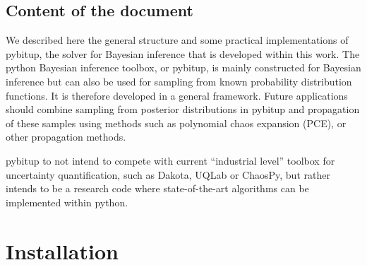 \documentclass[a4paper,11pt]{article}
\begin{document}
 
\subsection{Content of the document} 

We described here the general structure and some practical implementations of pybitup, the solver for Bayesian inference that is developed within this work. The python Bayesian inference toolbox, or pybitup, is mainly constructed for Bayesian inference but can also be used for sampling from known probability distribution functions. It is therefore developed in a general framework. Future applications should combine sampling from posterior distributions in pybitup and propagation of these samples using methods such as polynomial chaos expansion (PCE), or other propagation methods. 

pybitup to not intend to compete with current ``industrial level'' toolbox for uncertainty quantification, such as Dakota, UQLab or ChaosPy, but rather intends to be a research code where state-of-the-art algorithms can be implemented within python.



\section{Installation}
\end{document}
